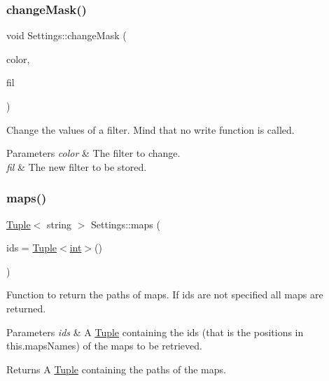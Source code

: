 \subsubsection{\texorpdfstring{changeMask()}{changeMask()}\hspace{0.1cm}{\footnotesize\ttfamily [2/2]}}
{\footnotesize\ttfamily void Settings\+::change\+Mask (\begin{DoxyParamCaption}\item[{\mbox{\hyperlink{class_settings_a30d85f2e06a54ae9bc8da2d01037658f}{C\+O\+L\+OR}}}]{color,  }\item[{\mbox{\hyperlink{class_filter}{Filter}}}]{fil }\end{DoxyParamCaption})}



Change the values of a filter. Mind that no write function is called. 


\begin{DoxyParams}{Parameters}
{\em color} & The filter to change. \\
\hline
{\em fil} & The new filter to be stored. \\
\hline
\end{DoxyParams}
\mbox{\label{class_settings_aa924e455cc6ac356ba6a4c59ab09591c}} 
\subsubsection{\texorpdfstring{maps()}{maps()}\hspace{0.1cm}{\footnotesize\ttfamily [1/4]}}
{\footnotesize\ttfamily \mbox{\hyperlink{class_tuple}{Tuple}}$<$ string $>$ Settings\+::maps (\begin{DoxyParamCaption}\item[{\mbox{\hyperlink{class_tuple}{Tuple}}$<$ \mbox{\hyperlink{draw_8hh_aa620a13339ac3a1177c86edc549fda9b}{int}} $>$}]{ids = {\ttfamily \mbox{\hyperlink{class_tuple}{Tuple}}$<$\mbox{\hyperlink{draw_8hh_aa620a13339ac3a1177c86edc549fda9b}{int}}$>$()} }\end{DoxyParamCaption})}



Function to return the paths of maps. If ids are not specified all maps are returned. 


\begin{DoxyParams}{Parameters}
{\em ids} & A \mbox{\hyperlink{class_tuple}{Tuple}} containing the ids (that is the positions in this.\+maps\+Names) of the maps to be retrieved. \\
\hline
\end{DoxyParams}
\begin{DoxyReturn}{Returns}
A \mbox{\hyperlink{class_tuple}{Tuple}} containing the paths of the maps. 
\end{DoxyReturn}
\mbox{\label{class_settings_adc050f187f4040f5e897b2ff41caedd0}} 
